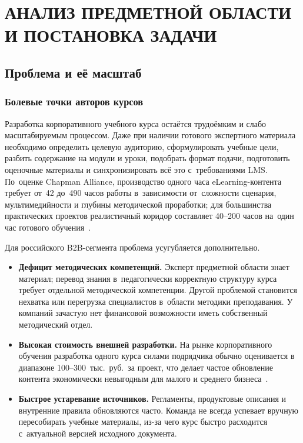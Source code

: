 \chapter{АНАЛИЗ ПРЕДМЕТНОЙ ОБЛАСТИ И ПОСТАНОВКА ЗАДАЧИ}

\section{Проблема и её масштаб}

\subsection{Болевые точки авторов курсов}

Разработка корпоративного учебного курса остаётся трудоёмким и слабо
масштабируемым процессом. Даже при наличии готового экспертного материала
необходимо определить целевую аудиторию, сформулировать учебные цели,
разбить содержание на модули и уроки, подобрать формат подачи,
подготовить оценочные материалы и синхронизировать всё это
с~требованиями LMS.
По~оценке Chapman Alliance, производство одного часа eLearning-контента
требует от~42 до~490 часов работы в~зависимости от~сложности сценария,
мультимедийности и глубины методической проработки; для большинства
практических проектов реалистичный коридор составляет 40–200 часов
на~один час готового обучения~\cite{chapman_elearning_hours_2010}.

Для российского B2B-сегмента проблема усугубляется дополнительно.

\begin{itemize}
  \item \textbf{Дефицит методических компетенций.} Эксперт предметной
    области знает материал; перевод знания
    в~педагогически корректную структуру курса требует отдельной
    методической компетенции. Другой проблемой становится нехватка или перегрузка специалистов
    в~области методики преподавания. У компаний зачастую нет финансовой возможности иметь собственный методический отдел.
  \item \textbf{Высокая стоимость внешней разработки.} На рынке
    корпоративного обучения разработка одного курса силами подрядчика
    обычно оценивается в диапазоне 100–300~тыс.\ руб.\ за проект,
    что делает частое обновление контента экономически невыгодным
    для малого и среднего бизнеса~\cite{smart_ranking_elearning_2024}.
  \item \textbf{Быстрое устаревание источников.} Регламенты, продуктовые
    описания и внутренние правила обновляются часто. Команда не всегда
    успевает вручную пересобирать учебные материалы, из-за чего курс
    быстро расходится с~актуальной версией исходного документа.
\end{itemize}

